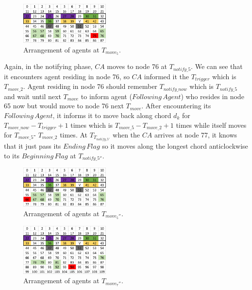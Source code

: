 \documentclass[conference]{IEEEtran}
\begin{document}
\begin{figure}[H]
  \centering  
  \includegraphics[width=0.4\textwidth]{figures/T75.png}
  \caption{Arrangement of agents at $T_{move_5}$. }\label{fig:T75}
\end{figure}
Again, in the notifying phase, $CA$ moves to node 76 at $T_{notify\_5}$. We can see that it encounters agent residing in node 76, so $CA$ informed it the $T_{trigger}$ which is $T_{move\_2}$. Agent residing in node 76 should remember $T_{notify\_now}$ which is $T_{notify\_5}$ and wait until next $T_{move}$ to inform agent ($Following\,Agent$) who resides in node 65 now but would move to node 76 next $T_{move}$. After encountering its $Following\,Agent$, it informs it to move back along chord $d_k$ for $T_{move\_now}-T_{trigger} +1$ times which is $T_{move\_5}- T_{move\_2}+1$ times while itself moves for $T_{move\_5}$- $T_{move\_2}$ times. 
At $T_{T_{notify\_5'}}$ when the $CA$ arrives at node 77, it knows that it just pass its $Ending\,Flag$ so it moves along the longest chord anticlockwise to its $Beginning\,Flag$ at $T_{notify\_5''}$.
\begin{figure}[H]
  \centering  
  \includegraphics[width=0.4\textwidth]{figures/T66.png}
  \caption{Arrangement of agents at $T_{move_5''}$. }\label{fig:T66}
\end{figure}

\begin{figure}[H]
  \centering  
  \includegraphics[width=0.4\textwidth]{figures/T94.png}
  \caption{Arrangement of agents at $T_{move_7''}$. }\label{fig:T94}
\end{figure}
\end{document}
